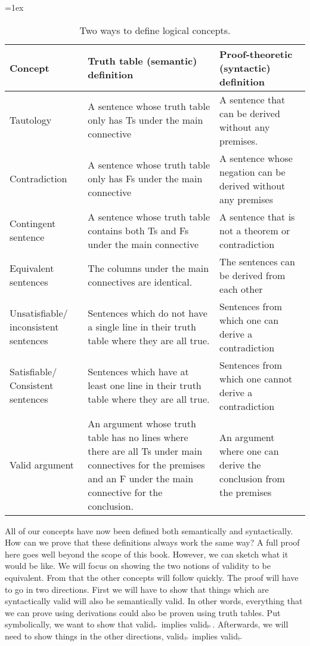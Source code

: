 \begin{sidewaystable}\small
\tabulinesep=1ex
\begin{tabu}{X[.5,c,m] ||X[1,l,m] |X[1,l,m]}
\textbf{Concept} 		&	\textbf{Truth table (semantic) definition} 	&	\textbf{Proof-theoretic (syntactic) definition} \\ \hline \hline

Tautology   &	A sentence whose truth table only has Ts under the main connective & A sentence that can be derived without any premises.	 \\ \hline
 
Contradiction		&	A sentence whose truth table only has Fs under the main connective  &	A sentence whose negation can be derived without any premises\\ \hline

Contingent sentence	&	A sentence whose truth table contains both Ts and Fs under the main connective & A sentence that is not a theorem or contradiction \\ \hline

Equivalent sentences &	The columns under the main connectives are identical.& The sentences can be derived from each other	\\ \hline

Unsatisfiable/ inconsistent sentences	&	Sentences which do not have a single line in their truth table where they are all true.	& Sentences  from which one can derive a contradiction \\ \hline

Satisfiable/ Consistent sentences	&	Sentences which have at least one line in their truth table where they are all true. & Sentences from which one cannot derive a contradiction	\\ \hline

Valid argument		&	An argument whose truth table has no lines where there are all Ts under main connectives for the premises and an F under the main connective for the conclusion.  & An argument where one can derive the conclusion from the premises	\\ 
\end{tabu}
\caption{Two ways to define logical concepts.}
\label{table:truth_tables_or_derivations}
\end{sidewaystable}

All of our concepts have now been defined both semantically and syntactically. How can we prove that these definitions always work the same way? A full proof here goes well beyond the scope of this book. However, we can sketch what it would be like. We will focus on showing the two notions of validity to be equivalent.  From that the other concepts will follow quickly. The proof will have to go in two directions. First we will have to show that things which are syntactically valid will also be semantically valid. In other words, everything that we can prove using derivations could also be proven using truth tables. Put symbolically, we want to show that valid$_{\vdash}$ implies valid$_{\vDash}$. Afterwards, we will need to show things in the other directions,  valid$_{\vDash}$ implies valid$_{\vdash}$

